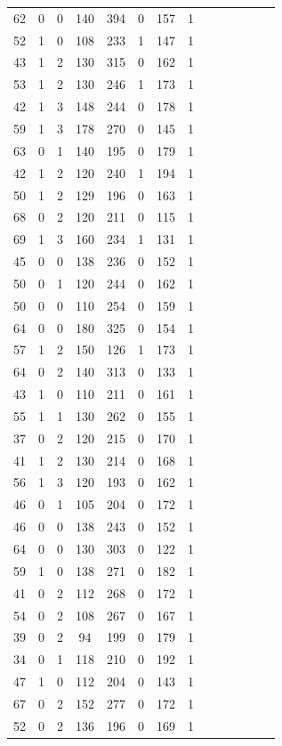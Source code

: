\documentclass{article}
\begin{document}
\begin{longtable}{|c|c|c|c|c|c|c|c|c|c|c|c|c|c|}
62 & 0 & 0 & 140 & 394 & 0 & 157 & 1\\
52 & 1 & 0 & 108 & 233 & 1 & 147 & 1\\
43 & 1 & 2 & 130 & 315 & 0 & 162 & 1\\
53 & 1 & 2 & 130 & 246 & 1 & 173 & 1\\
42 & 1 & 3 & 148 & 244 & 0 & 178 & 1\\
59 & 1 & 3 & 178 & 270 & 0 & 145 & 1\\
63 & 0 & 1 & 140 & 195 & 0 & 179 & 1\\
42 & 1 & 2 & 120 & 240 & 1 & 194 & 1\\
50 & 1 & 2 & 129 & 196 & 0 & 163 & 1\\
68 & 0 & 2 & 120 & 211 & 0 & 115 & 1\\
69 & 1 & 3 & 160 & 234 & 1 & 131 & 1\\
45 & 0 & 0 & 138 & 236 & 0 & 152 & 1\\
50 & 0 & 1 & 120 & 244 & 0 & 162 & 1\\
50 & 0 & 0 & 110 & 254 & 0 & 159 & 1\\
64 & 0 & 0 & 180 & 325 & 0 & 154 & 1\\
57 & 1 & 2 & 150 & 126 & 1 & 173 & 1\\
64 & 0 & 2 & 140 & 313 & 0 & 133 & 1\\
43 & 1 & 0 & 110 & 211 & 0 & 161 & 1\\
55 & 1 & 1 & 130 & 262 & 0 & 155 & 1\\
37 & 0 & 2 & 120 & 215 & 0 & 170 & 1\\
41 & 1 & 2 & 130 & 214 & 0 & 168 & 1\\
56 & 1 & 3 & 120 & 193 & 0 & 162 & 1\\
46 & 0 & 1 & 105 & 204 & 0 & 172 & 1\\
46 & 0 & 0 & 138 & 243 & 0 & 152 & 1\\
64 & 0 & 0 & 130 & 303 & 0 & 122 & 1\\
59 & 1 & 0 & 138 & 271 & 0 & 182 & 1\\
41 & 0 & 2 & 112 & 268 & 0 & 172 & 1\\
54 & 0 & 2 & 108 & 267 & 0 & 167 & 1\\
39 & 0 & 2 & 94 & 199 & 0 & 179 & 1\\
34 & 0 & 1 & 118 & 210 & 0 & 192 & 1\\
47 & 1 & 0 & 112 & 204 & 0 & 143 & 1\\
67 & 0 & 2 & 152 & 277 & 0 & 172 & 1\\
52 & 0 & 2 & 136 & 196 & 0 & 169 & 1\\

\end{longtable}
\end{document}
